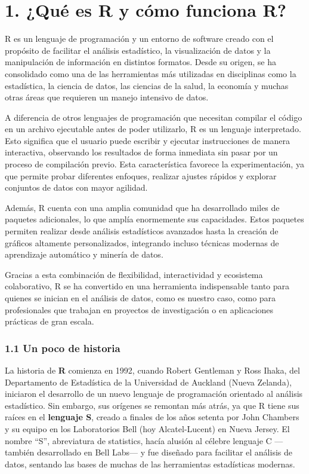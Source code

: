 \documentclass[
  letterpaper,
]{scrbook}
\begin{document}
\hypertarget{quuxe9-es-r-y-cuxf3mo-funciona-r}{%
\chapter{1. ¿Qué es R y cómo funciona
R?}\label{quuxe9-es-r-y-cuxf3mo-funciona-r}}

R es un lenguaje de programación y un entorno de software creado con el
propósito de facilitar el análisis estadístico, la visualización de
datos y la manipulación de información en distintos formatos. Desde su
origen, se ha consolidado como una de las herramientas más utilizadas en
disciplinas como la estadística, la ciencia de datos, las ciencias de la
salud, la economía y muchas otras áreas que requieren un manejo
intensivo de datos.

A diferencia de otros lenguajes de programación que necesitan compilar
el código en un archivo ejecutable antes de poder utilizarlo, R es un
lenguaje interpretado. Esto significa que el usuario puede escribir y
ejecutar instrucciones de manera interactiva, observando los resultados
de forma inmediata sin pasar por un proceso de compilación previo. Esta
característica favorece la experimentación, ya que permite probar
diferentes enfoques, realizar ajustes rápidos y explorar conjuntos de
datos con mayor agilidad.

Además, R cuenta con una amplia comunidad que ha desarrollado miles de
paquetes adicionales, lo que amplía enormemente sus capacidades. Estos
paquetes permiten realizar desde análisis estadísticos avanzados hasta
la creación de gráficos altamente personalizados, integrando incluso
técnicas modernas de aprendizaje automático y minería de datos.

Gracias a esta combinación de flexibilidad, interactividad y ecosistema
colaborativo, R se ha convertido en una herramienta indispensable tanto
para quienes se inician en el análisis de datos, como es nuestro caso,
como para profesionales que trabajan en proyectos de investigación o en
aplicaciones prácticas de gran escala.

\hypertarget{un-poco-de-historia}{%
\subsection{1.1 Un poco de historia}\label{un-poco-de-historia}}

La historia de \textbf{R} comienza en 1992, cuando Robert Gentleman y
Ross Ihaka, del Departamento de Estadística de la Universidad de
Auckland (Nueva Zelanda), iniciaron el desarrollo de un nuevo lenguaje
de programación orientado al análisis estadístico. Sin embargo, sus
orígenes se remontan más atrás, ya que R tiene sus raíces en el
\textbf{lenguaje S}, creado a finales de los años setenta por John
Chambers y su equipo en los Laboratorios Bell (hoy Alcatel-Lucent) en
Nueva Jersey. El nombre ``S'', abreviatura de statistics, hacía alusión
al célebre lenguaje C ---también desarrollado en Bell Labs--- y fue
diseñado para facilitar el análisis de datos, sentando las bases de
muchas de las herramientas estadísticas modernas.
\end{document}
